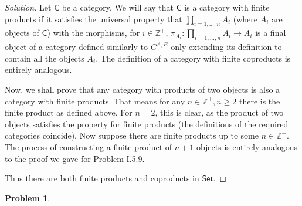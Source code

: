 \documentclass{article}
\theoremstyle{definition}
\newtheorem{problem-internal}{Problem}[subsection]
\newenvironment{problem}{
	\medskip
	\begin{problem-internal}
	}{
\end{problem-internal}
}
\newenvironment{solution}{
	\begin{proof}[Solution]
		\vspace{-8px}
		\setlength{\parskip}{4px}
		\setlength{\parindent}{0px}
	}{
\end{proof}
}
\newcommand{\C}{\mathsf{C}}
\newcommand{\Cset}{\mathsf{Set}}
\begin{document}
\begin{solution}
	Let $\C$ be a category. We will say that $\C$ is a category with finite products if it satisfies the universal property that $\prod_{i=1,\dots, n} A_i$ (where $A_i$ are objects of $\C$) with the morphisms, for $i \in \mathbb{Z}^+$, $\pi_{A_i}: \prod_{i=1,\dots, n} A_i \to A_i$ is a final object of a category defined similarly to $C^{A,B}$ only extending its definition to contain all the objects $A_i$. The definition of a category with finite coproducts is entirely analogous.
	
	Now, we shall prove that any category with products of two objects is also a category with finite products. That means for any $n \in \mathbb{Z}^+, n \geq 2$ there is the finite product as defined above. For $n = 2$, this is clear, as the product of two objects satisfies the property for finite products (the definitions of the required categories coincide). Now suppose there are finite products up to some $n \in \mathbb{Z}^+$. The process of constructing a finite product of $n + 1$ objects is entirely analogous to the proof we gave for Problem I.5.9.
	
	Thus there are both finite products and coproducts in $\Cset$.
\end{solution}

\begin{problem}
\end{problem}
\end{document}
